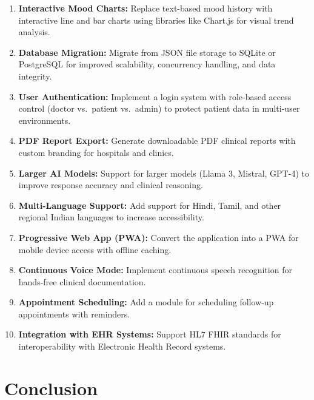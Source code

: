 \documentclass[12pt,a4paper]{report}
\begin{document}
\begin{enumerate}
    \item \textbf{Interactive Mood Charts:} Replace text-based mood history with interactive line and bar charts using libraries like Chart.js for visual trend analysis.

    \item \textbf{Database Migration:} Migrate from JSON file storage to SQLite or PostgreSQL for improved scalability, concurrency handling, and data integrity.

    \item \textbf{User Authentication:} Implement a login system with role-based access control (doctor vs.\ patient vs.\ admin) to protect patient data in multi-user environments.

    \item \textbf{PDF Report Export:} Generate downloadable PDF clinical reports with custom branding for hospitals and clinics.

    \item \textbf{Larger AI Models:} Support for larger models (Llama 3, Mistral, GPT-4) to improve response accuracy and clinical reasoning.

    \item \textbf{Multi-Language Support:} Add support for Hindi, Tamil, and other regional Indian languages to increase accessibility.

    \item \textbf{Progressive Web App (PWA):} Convert the application into a PWA for mobile device access with offline caching.

    \item \textbf{Continuous Voice Mode:} Implement continuous speech recognition for hands-free clinical documentation.

    \item \textbf{Appointment Scheduling:} Add a module for scheduling follow-up appointments with reminders.

    \item \textbf{Integration with EHR Systems:} Support HL7 FHIR standards for interoperability with Electronic Health Record systems.
\end{enumerate}

\chapter{Conclusion}
\end{document}
